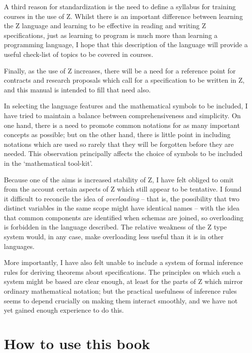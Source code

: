 A third reason for standardization is the need to define a syllabus
for training courses in the use of Z.  Whilst
there is an important difference between learning the Z language and
learning to be effective in reading and writing Z specifications, just
as learning to program is much more than learning a programming
language, I hope that this description of the language will provide a
useful check-list of topics to be covered in courses.

Finally, as the use of Z increases, there will be a need for a
reference point for contracts and research proposals which call
for a specification to be written in Z, and this manual is intended
to fill that need also.

In selecting the language features and the mathematical symbols to be
included, I have tried to maintain a balance between
comprehensiveness and simplicity. On one hand, there is a need to promote
common notations for as many important concepts as possible; but on the
other hand, there is little point in including notations which are used
so rarely that they will be forgotten before they are needed. This
observation principally affects the choice of symbols to be included in
the `mathematical tool-kit'.

Because one of the aims is increased stability of Z, I have felt
obliged to omit from the account certain aspects of Z which still
appear to be tentative. I found it difficult to reconcile the idea of
{\em overloading\/} -- that is, the
possibility that two distinct variables in the same scope might have
identical names -- with the idea that common components are
identified when schemas are joined, so overloading is forbidden in
the language described.  The relative weakness of the Z type system
would, in any case, make overloading less useful than it is in other
languages.

More importantly, I have also felt unable to include a system of
formal inference rules for deriving theorems
about specifications.  The principles on which such a system might be
based are clear enough, at least for the parts of Z which mirror
ordinary mathematical notation; but the practical usefulness of
inference rules seems to depend crucially on making them interact
smoothly, and we have not yet gained enough experience to do this.

\section*{How to use this book}

